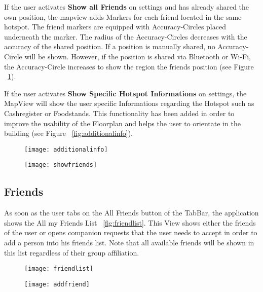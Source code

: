 If the user activates \textbf{Show all Friends} on settings and has already shared the own position, the mapview adds Markers for each friend located in the same hotspot. The friend markers are equipped with Accuracy-Circles placed underneath the marker. The radius of the Accuracy-Circles decreases with the accuracy of the shared position. If a position is manually shared, no Accuracy-Circle will be shown. However, if the position is shared via Bluetooth or Wi-Fi, the Accuracy-Circle increases to show the region the friends position (see Figure ~\ref{fig:showfriends}). 

If the user activates \textbf{Show Specific Hotspot Informations} on settings, the MapView will show the user specific Informations regarding the Hotspot such as Cashregister or Foodstands. This functionality has been added in order to improve the usability of the Floorplan and helps the user to orientate in the building (see Figure ~\ref{fig:additionalinfo}).

\begin{figure}
\centering
\begin{minipage}{.5\textwidth}
  \centering
  \texttt{[image: additionalinfo]}
  \label{fig:additionalinfo}
\end{minipage}%
\begin{minipage}{.5\textwidth}
  \centering
  \texttt{[image: showfriends]}
  \label{fig:showfriends}
\end{minipage}
\end{figure}


\subsection{Friends}

As soon as the user tabs on the All Friends button of the TabBar, the application shows the All my Friends List ~\ref{fig:friendlist}. This View shows either the friends of the user or opens companion requests that the user needs to accept in order to add a person into his friends list. Note that all available friends will be shown in this list regardless of their group affiliation.

\begin{figure}
\centering
\begin{minipage}{.5\textwidth}
  \centering
  \texttt{[image: friendlist]}
  \label{fig:friendlist}
\end{minipage}%
\begin{minipage}{.5\textwidth}
  \centering
  \texttt{[image: addfriend]}
  \label{fig:addfriend}
\end{minipage}
\end{figure}

